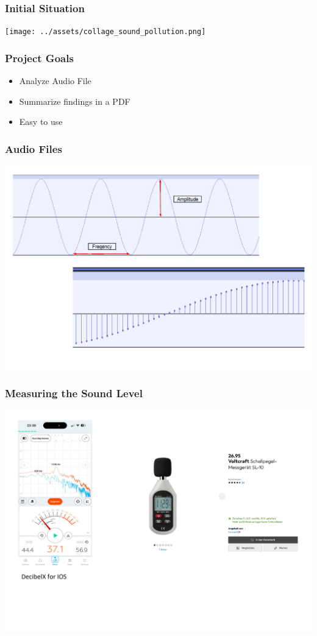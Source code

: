 \begin{frame}
    \frametitle{Initial Situation}
    \centering
    \texttt{[image: ../assets/collage\_sound\_pollution.png]}
\end{frame}

\begin{frame}
    \frametitle{Project Goals}
    \begin{itemize}[<+->]
        \large
        \item Analyze Audio File
        \item Summarize findings in a PDF
        \item Easy to use
    \end{itemize}
\end{frame}

\begin{frame}
    \frametitle{Audio Files}
    \centering
    \includegraphics[width=0.8\linewidth]{../assets/audiofile_description.png}
\end{frame}

\begin{frame}
    \frametitle{Measuring the Sound Level}
    \centering
    \includegraphics[width=0.8\linewidth]{../assets/measure_sound_level.png}
\end{frame}


